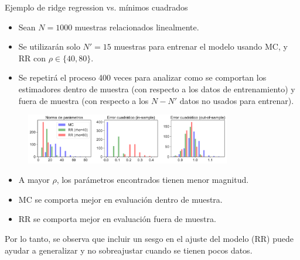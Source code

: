 \documentclass[9pt]{beamer}
\begin{document}
\begin{frame}{Ejemplo de ridge regression vs. mínimos cuadrados}

\begin{itemize}
	\item Sean $N=1000$ muestras relacionados linealmente.\pause
	\item Se utilizarán solo $N'=15$ muestras para entrenar el modelo usando MC, y RR con $\rho\in\{40,80\}$.\pause
	\item Se repetirá el proceso 400 veces para analizar como se comportan los estimadores dentro de muestra (con respecto a los datos de entrenamiento) y fuera de muestra (con respecto a los $N-N'$ datos no usados para entrenar).\pause
\end{itemize}
	
\begin{figure}[H]
	\centering
	\includegraphics[width=0.8\textwidth]{../img/cap2_bias-variance.pdf}\\
	\label{fig:MCvsRR_Synth}  
\end{figure}\pause

\begin{itemize}
	\item A mayor $\rho$, los parámetros encontrados tienen menor magnitud.\pause
	\item MC se comporta mejor en evaluación dentro de muestra.\pause
	\item RR se comporta mejor en evaluación fuera de muestra.\pause
\end{itemize}

Por lo tanto, se observa que incluir un sesgo en el ajuste del modelo (RR) puede ayudar a generalizar y no sobreajustar cuando se tienen pocos datos. 
		
\end{frame}
\end{document}
